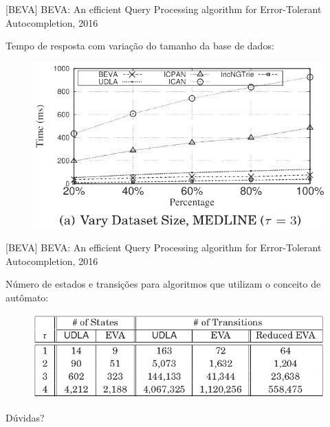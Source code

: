 \documentclass[11pt]{beamer}
\begin{document}
\begin{frame}{[BEVA] BEVA: An efficient Query Processing algorithm for Error-Tolerant Autocompletion, 2016}

    Tempo de resposta com variação do tamanho da base de dados:
    
    \begin{figure}
      \includegraphics[scale=0.40]{pictures/varyng_dataset_size_beva.png}
      \centering
    \end{figure}
   
\end{frame}

\begin{frame}{[BEVA] BEVA: An efficient Query Processing algorithm for Error-Tolerant Autocompletion, 2016}

    Número de estados e transições para algoritmos que utilizam o conceito de autômato:
    
    \begin{figure}
      \includegraphics[scale=0.40]{pictures/automata_size_beva.png}
      \centering
    \end{figure}
   
\end{frame}


\begin{frame}[allowframebreaks]{}

  
%   
  

\end{frame}

{
\begin{frame}[standout]
  Dúvidas?
\end{frame}
}
\end{document}
